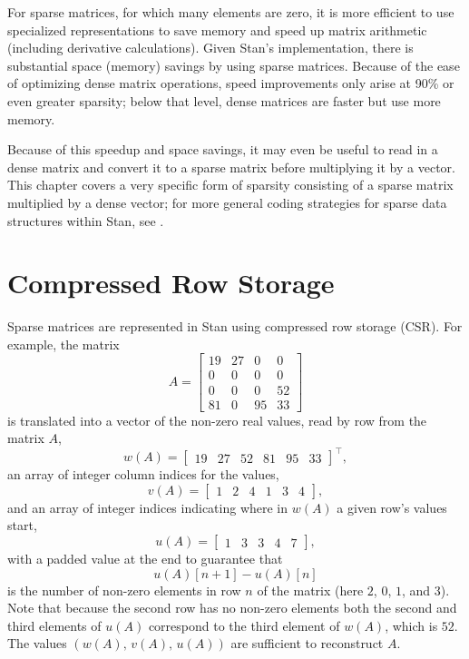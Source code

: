 \noindent
For sparse matrices, for which many elements are zero, it is more
efficient to use specialized representations to save memory and speed
up matrix arithmetic (including derivative calculations).  Given
Stan's implementation, there is substantial space (memory) savings by
using sparse matrices.  Because of the ease of optimizing dense matrix
operations, speed improvements only arise at 90\% or even greater
sparsity; below that level, dense matrices are faster but use more memory.  

Because of this speedup and space savings, it may even be useful to
read in a dense matrix and convert it to a sparse matrix before
multiplying it by a vector.  This chapter covers a very specific form
of sparsity consisting of a sparse matrix multiplied by a dense
vector; for more general coding strategies for sparse data structures
within Stan, see .

\section{Compressed Row Storage}\label{CSR.section}

Sparse matrices are represented in Stan using compressed row storage
(CSR).  For example, the matrix
\[
A = 
\begin{bmatrix}
19 & 27 & 0 & 0 
\\ 
0 & 0 & 0 & 0 
\\
0 & 0 & 0 & 52
\\
81 & 0 & 95 & 33
\end{bmatrix}
\]
is translated into a vector of the non-zero real values, read by row
from the matrix $A$,
\[
w(A) =
\begin{bmatrix}
19 & 27 & 52 & 81 & 95 & 33
\end{bmatrix}^{\top} \! \! \! ,
\]
an array of integer column indices for the values,
\[
v(A) = 
\begin{bmatrix}
1 & 2 & 4 & 1 & 3 & 4
\end{bmatrix} \! ,
\]
and an array of integer indices indicating where in $w(A)$ a given row's
values start,
\[
u(A) = 
\begin{bmatrix}
1 & 3 & 3 & 4 & 7
\end{bmatrix} \! ,
\]
with a padded value at the end to guarantee that 
\[
u(A)[n+1] - u(A)[n]
\]
is the number of non-zero elements in row $n$ of the matrix (here $2$, $0$,
$1$, and $3$). Note that because the second row has no non-zero elements both
the second and third elements of $u(A)$ correspond to the third element of
$w(A)$, which is $52$. The values $(w(A), \, v(A), \, u(A))$ are sufficient 
to reconstruct $A$.

